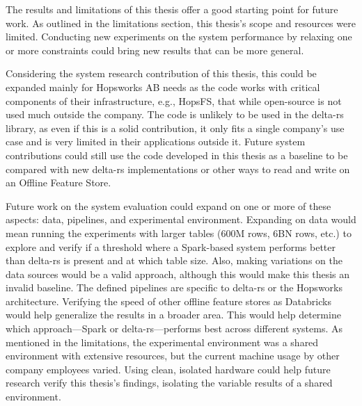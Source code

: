 The results and limitations of this thesis offer a good starting point for future work. As outlined in the limitations section, this thesis's scope and resources were limited. Conducting new experiments on the system performance by relaxing one or more constraints could bring new results that can be more general.

Considering the system research contribution of this thesis, this could be expanded mainly for Hopsworks \gls{AB} needs as the code works with critical components of their infrastructure, e.g., \gls{HopsFS}, that while open-source is not used much outside the company. The code is unlikely to be used in the delta-rs library, as even if this is a solid contribution, it only fits a single company's use case and is very limited in their applications outside it. Future system contributions could still use the code developed in this thesis as a baseline to be compared with new delta-rs implementations or other ways to read and write on an Offline Feature Store.

Future work on the system evaluation could expand on one or more of these aspects: data, pipelines, and experimental environment. Expanding on data would mean running the experiments with larger tables (600M rows, 6BN rows, etc.) to explore and verify if a threshold where a Spark-based system performs better than delta-rs is present and at which table size. Also, making variations on the data sources would be a valid approach, although this would make this thesis an invalid baseline. The defined pipelines are specific to delta-rs or the Hopsworks architecture. Verifying the speed of other offline feature stores as Databricks would help generalize the results in a broader area. This would help determine which approach—Spark or delta-rs—performs best across different systems.
As mentioned in the limitations, the experimental environment was a shared environment with extensive resources, but the current machine usage by other company employees varied. Using clean, isolated hardware could help future research verify this thesis's findings, isolating the variable results of a shared environment.